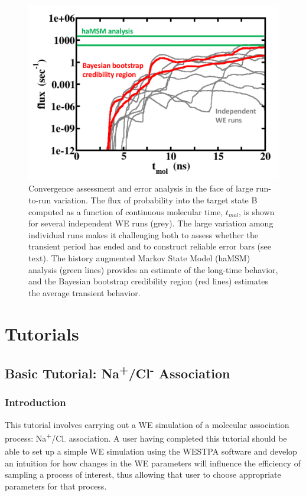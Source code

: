 \documentclass[9pt,tutorial,ASAPversion]{livecoms}
\begin{document}
\begin{figure}
\includegraphics[width=\linewidth]{Figure3.png}
\caption{Convergence assessment and error analysis in the face of large run-to-run variation. 
The flux of probability into the target state B computed as a function of continuous molecular time, $t_{mol}$, is shown for several independent WE runs (grey). 
The large variation among individual runs makes it challenging both to assess whether the transient period has ended and to construct reliable error bars (see text). 
The history augmented Markov State Model (haMSM) analysis (green lines) provides an estimate of the long-time behavior, and the Bayesian bootstrap credibility region (red lines) estimates the average transient behavior.}
\label{fig:view}
\end{figure}

\section{Tutorials}

\subsection{Basic Tutorial: Na\textsuperscript{+}/Cl\textsuperscript{-} Association}

\subsubsection{Introduction}

This tutorial involves carrying out a WE simulation of a molecular association process: Na\textsuperscript{+}/Cl\textsubscript{-} association. 
A user having completed this tutorial should be able to set up a simple WE simulation using the WESTPA software and develop an intuition for how changes in the WE parameters will influence the efficiency of sampling a process of interest, thus allowing that user to choose appropriate parameters for that process.
\end{document}
